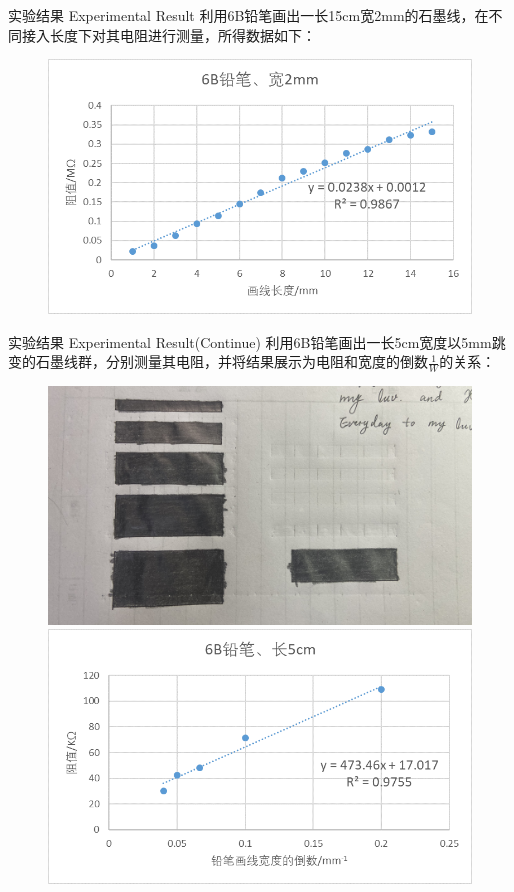 \documentclass[10pt]{beamer}
\begin{document}
	
	\begin{frame}{实验结果 Experimental Result}
		利用6B铅笔画出一长15cm宽2mm的石墨线，在不同接入长度下对其电阻进行测量，所得数据如下：
		\begin{figure}
			\centering
			\includegraphics[width=0.8\linewidth]{figs/c}
			\label{fig:f3}
		\end{figure}
	\end{frame}
	
	
	\begin{frame}{实验结果 Experimental Result(Continue)}
		利用6B铅笔画出一长5cm宽度以5mm跳变的石墨线群，分别测量其电阻，并将结果展示为电阻和宽度的倒数$ \frac{1}{W} $的关系：
		\begin{figure}
			\centering
			\includegraphics[width=0.3\linewidth]{figs/f6}\pause \\
			\includegraphics[width=0.7\linewidth]{figs/d}
			\label{fig:f3}
		\end{figure}
	\end{frame}
	
	
	
\end{document}
